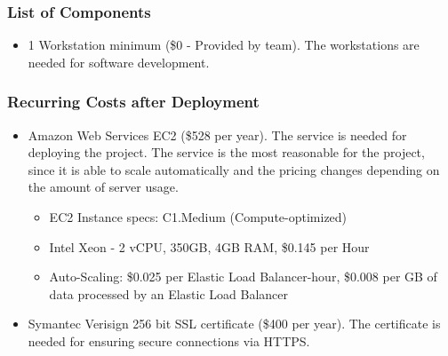 \label{sec:detailedBudget}

\subsubsection{List of Components}
\begin{itemize}
\item 1 Workstation minimum (\$0 - Provided by team). The workstations are
needed for software development.
\end{itemize}

\subsubsection{Recurring Costs after Deployment}
\begin{itemize}
\item Amazon Web Services EC2 (\$528 per year). The service is needed for
deploying the project. The service is the most reasonable for the project, since
it is able to scale automatically and the pricing changes depending on the
amount of server usage.
\begin{itemize}
\item EC2 Instance specs: C1.Medium (Compute-optimized)
\item Intel Xeon - 2 vCPU, 350GB, 4GB RAM, \$0.145 per Hour
\item Auto-Scaling: \$0.025 per Elastic Load Balancer-hour, \$0.008 per GB of data processed by an Elastic Load Balancer
\end{itemize}


\item Symantec Verisign 256 bit SSL certificate (\$400 per year). The
certificate is needed for ensuring secure connections via HTTPS.
\end{itemize}

